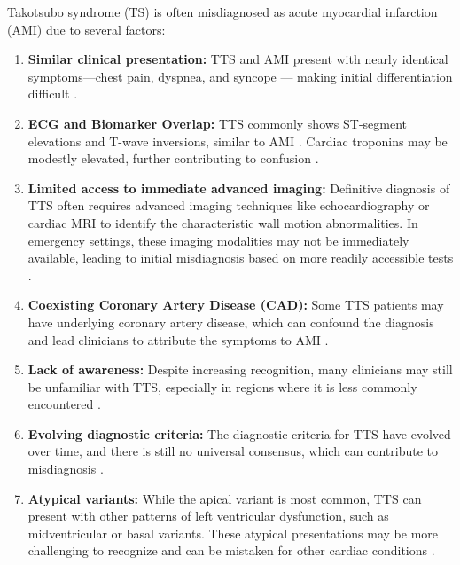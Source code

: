\documentclass[12pt, BSc]{muthesis}
\begin{document}
Takotsubo syndrome (TS) is often misdiagnosed as acute myocardial infarction (AMI) due to several factors:
\begin{enumerate}
    \item \textbf{Similar clinical presentation:} TTS and AMI present with nearly identical symptoms—chest pain, dyspnea, and syncope — making initial differentiation difficult \cite{Ghadri2018}. 



    \item \textbf{ECG and Biomarker Overlap:} TTS commonly shows ST-segment elevations and T-wave inversions, similar to AMI \cite{Templin2015}. Cardiac troponins may be modestly elevated, further contributing to confusion \cite{Akashi2015}.

    \item \textbf{Limited access to immediate advanced imaging:} Definitive diagnosis of TTS often requires advanced imaging techniques like echocardiography or cardiac MRI to identify the characteristic wall motion abnormalities. In emergency settings, these imaging modalities may not be immediately available, leading to initial misdiagnosis based on more readily accessible tests \cite{Medina2018}.

    \item \textbf{Coexisting Coronary Artery Disease (CAD):} Some TTS patients may have underlying coronary artery disease, which can confound the diagnosis and lead clinicians to attribute the symptoms to AMI \cite{Templin2015}.

    \item \textbf{Lack of awareness:} Despite increasing recognition, many clinicians may still be unfamiliar with TTS, especially in regions where it is less commonly encountered \cite{Lyon2016}.

    \item \textbf{Evolving diagnostic criteria:} The diagnostic criteria for TTS have evolved over time, and there is still no universal consensus, which can contribute to misdiagnosis \cite{Ghadri2018}.

    \item \textbf{Atypical variants:} While the apical variant is most common, TTS can present with other patterns of left ventricular dysfunction, such as midventricular or basal variants. These atypical presentations may be more challenging to recognize and can be mistaken for other cardiac conditions \cite{Ghadri2018}.

\end{enumerate}
\end{document}
